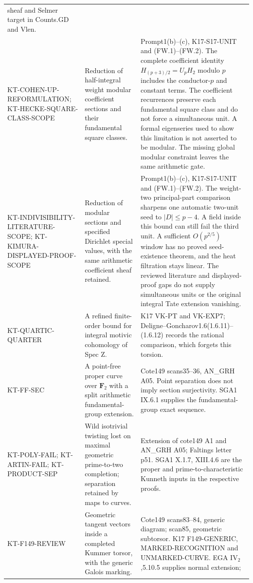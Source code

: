 \begin{longtable}{>{\raggedright\arraybackslash}p{}
>{\raggedright\arraybackslash}p{}
>{\raggedright\arraybackslash}p{}}
sheaf and Selmer target in Counts.GD and Vlen.\\
KT-COHEN-UP-REFORMULATION;
KT-HECKE-SQUARE-CLASS-SCOPE &
Reduction of half-integral weight modular coefficient sections
and their fundamental square classes. &
Prompt1(b)--(c), K17-S17-UNIT and (FW.1)--(FW.2).
The complete coefficient identity $H_{(p+3)/2}=U_pH_2$ modulo $p$
includes the conductor-$p$ and constant terms. The coefficient
recurrences preserve each fundamental square class and do not
force a simultaneous unit. A formal eigenseries used to show
this limitation is not asserted to be modular. The missing
global modular constraint leaves the same arithmetic gate.\\
KT-INDIVISIBILITY-LITERATURE-SCOPE;
KT-KIMURA-DISPLAYED-PROOF-SCOPE &
Reduction of modular sections and specified Dirichlet special values,
with the same arithmetic coefficient sheaf retained. &
Prompt1(b)--(c), K17-S17-UNIT and (FW.1)--(FW.2).
The weight-two principal-part comparison sharpens one automatic
two-unit seed to $|D|\leq p-4$. A field inside this bound can still
fail the third unit. A sufficient $O(p^{2/5})$ window has no proved
seed-existence theorem, and the heat filtration stays linear.
The reviewed literature and displayed-proof gaps do not supply
simultaneous units or the original integral Tate extension vanishing.\\
KT-QUARTIC-QUARTER &
A refined finite-order bound for integral motivic cohomology
of Spec Z. &
K17 VK-PT and VK-EXP7; Deligne--Goncharov1.6(1.6.11)--(1.6.12)
records the rational comparison, which forgets this torsion.\\
KT-FF-SEC &
A point-free proper curve over $\mathbf F_2$ with a split
arithmetic fundamental-group extension. &
Cote149 scans35--36, AN\_GRH A05. Point separation does not
imply section surjectivity. SGA1 IX.6.1 supplies the
fundamental-group exact sequence.\\
KT-POLY-FAIL; KT-ARTIN-FAIL; KT-PRODUCT-SEP &
Wild isotrivial twisting lost on maximal geometric
prime-to-two completion; separation retained by maps to curves. &
Extension of cote149 A1 and AN\_GRH A05; Faltings letter p51.
SGA1 X.1.7, XIII.4.6 are the proper and prime-to-characteristic
Kunneth inputs in the respective proofs.\\
KT-F149-REVIEW &
Geometric tangent vectors inside a completed Kummer torsor,
with the generic Galois marking. &
Cote149 scans83--84, generic diagram; scan85, geometric
subtorsor. K17 F149-GENERIC, MARKED-RECOGNITION and
UNMARKED-CURVE. EGA IV$_2$,5.10.5 supplies normal extension;

\end{longtable}

